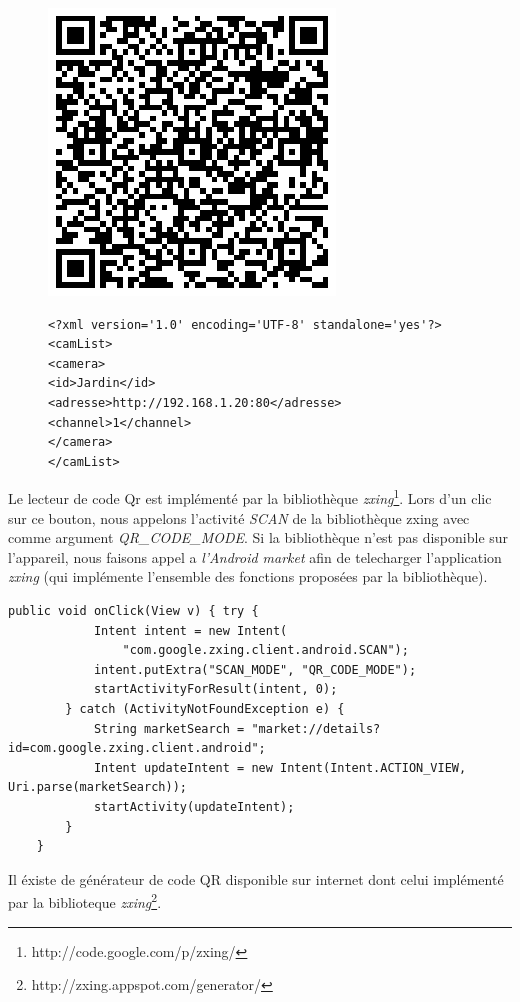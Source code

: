 \begin{figure}[H]
  \includegraphics{Images/chart.eps}
  \begin{lstlisting}[format=XML]
<?xml version='1.0' encoding='UTF-8' standalone='yes'?>
<camList>
<camera>
<id>Jardin</id>
<adresse>http://192.168.1.20:80</adresse>
<channel>1</channel>
</camera>
</camList>
\end{lstlisting}
\end{figure}

\indent Le lecteur de code Qr est implémenté par la bibliothèque
\textit{zxing}\footnote{\label{zxing} http://code.google.com/p/zxing/}. 
Lors d'un clic sur ce bouton, nous appelons l'activité 
\textit{SCAN} de la bibliothèque zxing avec comme argument
\textit{QR\_CODE\_MODE}.
Si la bibliothèque n'est pas disponible sur l'appareil, nous faisons appel a
\textit{l'Android market} afin de telecharger l'application \textit{zxing} (qui
implémente l'ensemble des fonctions proposées par la bibliothèque).
\newpage
\begin{lstlisting}[caption={Lancement de l'activité zxing ou de l'Android
market.}] 
    public void onClick(View v) { try {
            Intent intent = new Intent(
                "com.google.zxing.client.android.SCAN");
            intent.putExtra("SCAN_MODE", "QR_CODE_MODE");
            startActivityForResult(intent, 0);
        } catch (ActivityNotFoundException e) {
            String marketSearch = "market://details?id=com.google.zxing.client.android";
            Intent updateIntent = new Intent(Intent.ACTION_VIEW, Uri.parse(marketSearch));
            startActivity(updateIntent);
        }
    }
\end{lstlisting}

\indent \newline
\indent Il éxiste de générateur de code QR disponible sur internet dont celui
implémenté par la biblioteque
\textit{zxing}\footnote{\label{zxingGenerator}
http://zxing.appspot.com/generator/}.

